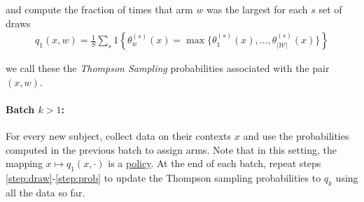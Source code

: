 \documentclass[letterpaper, 12pt, parskip=full, headsepline]{scrartcl}
\begin{document}
\begin{enumerate}
  and compute the fraction of times that arm $w$ was the largest for each $s$ set of draws
  \begin{align}
    q_{1}(x, w) = \frac{1}{S} \sum_{s} 1\left\{ \theta_{w}^{(s)}(x) = \max \{\theta_{1}^{(s)}(x), \dots, \theta_{|\mathcal{W}|}^{(s)}(x) \}  \right\}
  \end{align}

  we call these the \textit{Thompson Sampling} probabilities associated with the pair $(x, w)$. 
\end{enumerate}

\paragraph{Batch $k > 1$:} For every new subject, collect data on their contexts $x$ and use the probabilities computed in the previous batch to assign arms. Note that in this setting, the mapping $x \mapsto q_{1}(x, \cdot)$ is a \hyperlink{policy}{policy}. At the end of each batch, repeat steps \ref{step:draw}-\ref{step:prob} to update the Thompson sampling probabilities to $q_{k}$ using all the data so far.
\end{document}
